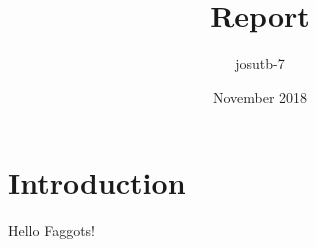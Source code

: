 \documentclass{article}
\title{Report}
\author{josutb-7 }
\date{November 2018}
\begin{document}
\maketitle

\section{Introduction}

	Hello Faggots!	
\end{document}
